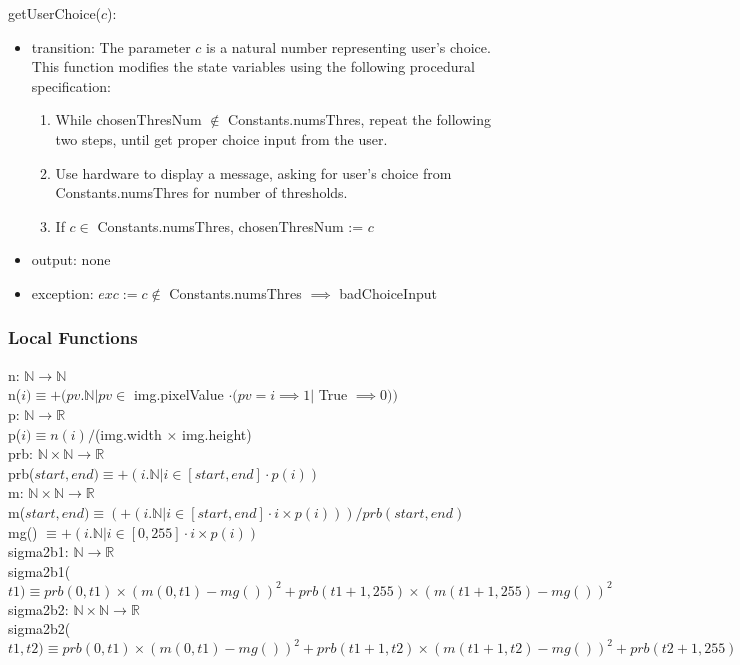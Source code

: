 \documentclass[12pt, titlepage]{article}
\begin{document}
\noindent getUserChoice($c$):
\begin{itemize}
\item transition:
The parameter $c$ is a natural number representing user's choice. This function
modifies the state variables using the following procedural specification:
\begin{enumerate}
\item While chosenThresNum $\not\in$ Constants.numsThres, repeat the following
two steps, until get proper choice input from the user.
\item Use hardware to display a message, asking for user's choice from
Constants.numsThres
for number of thresholds.
\item If $c \in$ Constants.numsThres, chosenThresNum := $c$
\end{enumerate}
\item output: none
\item exception: $exc := c \not\in$ Constants.numsThres
$\implies$ badChoiceInput
\end{itemize}

\subsubsection{Local Functions}

n: $\mathbb{N} \rightarrow \mathbb{N}$\\
n($i) \equiv +(pv.\mathbb{N} |pv \in$ img.pixelValue $\cdot
(pv = i \implies 1 |$ True $\implies 0))$\\
p: $\mathbb{N} \rightarrow \mathbb{R}$\\
p($i) \equiv n(i)/$(img.width $\times$ img.height)\\
prb: $\mathbb{N} \times \mathbb{N} \rightarrow \mathbb{R}$\\
prb($start,end) \equiv +(i.\mathbb{N} | i \in [start,end] \cdot p(i))$\\
m: $\mathbb{N} \times \mathbb{N} \rightarrow \mathbb{R}$\\
m($start,end) \equiv (+(i.\mathbb{N} | i \in [start,end] \cdot i \times
p(i)))/prb(start,end)$\\
mg() $\equiv +(i.\mathbb{N} | i \in [0,255] \cdot i \times p(i))$\\
sigma2b1: $\mathbb{N} \rightarrow \mathbb{R}$\\
sigma2b1($t1) \equiv prb(0,t1) \times (m(0,t1)-mg())^2 + prb(t1+1,255)
\times (m(t1+1,255)-mg())^2$\\
sigma2b2: $\mathbb{N} \times \mathbb{N} \rightarrow
\mathbb{R}$\\
sigma2b2($t1,t2) \equiv prb(0,t1) \times (m(0,t1)-mg())^2 + prb(t1+1,t2)
\times (m(t1+1,t2)-mg())^2 + prb(t2+1,255) \times (m(t2+1,255)-mg())^2$\\
\end{document}
